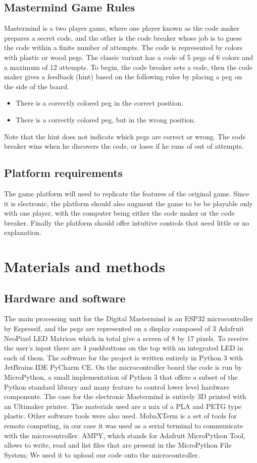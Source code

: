 \documentclass[a4paper, 12pt]{article}
\begin{document}
\subsection{Mastermind Game Rules}
Mastermind is a two player game, where one player known as the code
maker prepares a secret code, and the other is the code breaker whose
job is to guess the code within a finite number of attempts. The code is
represented by colors with plastic or wood pegs. The classic variant has
a code of 5 pegs of 6 colors and a maximum of 12 attempts. To begin, the
code breaker sets a code, then the code maker gives a feedback (hint)
based on the following rules by placing a peg on the side of the board.
\begin{itemize}
    \item There is a correctly colored peg in the correct position.
    \item There is a correctly colored peg, but in the wrong position.
\end{itemize}
Note that the hint does not indicate which pegs are correct or wrong.
The code breaker wins when he discovers the code, or loses if he runs of
out of attempts.

\subsection{Platform requirements}
The game platform will need to replicate the features of the original
game. Since it is electronic, the platform should also augment the game
to be be playable only with one player, with the computer being either
the code maker or the code breaker. Finally the platform should offer
intuitive controls that need little or no explanation.

\section{Materials and methods}
\subsection{Hardware and software}
The main processing unit for the Digital Mastermind is an ESP32
microcontroller by Espressif, and the pegs are represented on a display
composed of 3 Adafruit NeoPixel LED Matrices which in total give a
screen of 8 by 17 pixels. To receive the user’s input there are 4
pushbuttons on the top with an integrated LED in each of them.
The software for the project is written entirely in Python 3 with
JetBrains IDE PyCharm CE. On the microcontroller board the code is run
by MicroPython, a small implementation of Python 3 that offers a subset
of the Python standard library and many feature to control lower level
hardware components. The case for the electronic Mastermind is entirely
3D printed with an Ultimaker printer. The materials used are a mix of a
PLA and PETG type plastic. Other software tools were also used.
MobaXTerm is a set of tools for remote computing, in our case it was
used as a serial terminal to communicate with the microcontroller. AMPY,
which stands for Adafruit MicroPython Tool, allows to write, read and
list files that are present in the MicroPython File System; We used it
to upload our code onto the microcontroller.
\end{document}
